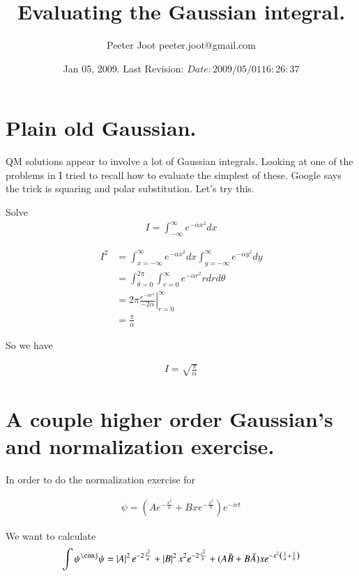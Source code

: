 \documentclass{article}
\title{ Evaluating the Gaussian integral. }
\author{Peeter Joot \quad peeter.joot@gmail.com}
\date{ Jan 05, 2009.  Last Revision: $Date: 2009/05/01 16:26:37 $ }
\begin{document}
\maketitle{}
\section{ Plain old Gaussian. }

QM solutions appear to involve a lot of Gaussian integrals.  Looking at one
of the problems in \cite{mcmahon2005qmd} I tried to recall how to evaluate
the simplest of these.  Google says the trick is squaring and polar 
substitution.  Let's try this.

Solve
\begin{align*}
I = \int_{-\infty}^\infty e^{-\alpha x^2} dx
\end{align*}

\begin{align*}
I^2 
&= \int_{x= -\infty}^\infty e^{-\alpha x^2} dx \int_{y = -\infty}^\infty e^{-\alpha y^2} dy \\
&= \int_{\theta=0}^{2\pi}\int_{r= 0}^\infty e^{-\alpha r^2} r dr d\theta \\
&= 2\pi 
{\left.
\frac{e^{-\alpha r^2}}{-2\alpha}
\right\vert}_{r= 0}^\infty  \\
&= \frac{\pi}{\alpha}
\end{align*}

So we have

\begin{align*}
I = \sqrt{\frac{\pi}{\alpha}}
\end{align*}

\section{ A couple higher order Gaussian's and normalization exercise. }

In order to do the normalization exercise for

\begin{align}\label{eqn:exersize}
\psi = \left(A e^{-\frac{x^2}{a}} +B x e^{-\frac{x^2}{b}}\right) e^{-ict}
\end{align}

We want to calculate
\begin{align*}
\int \psi^\conj \psi = 
\Abs{A}^2 e^{-2\frac{x^2}{a}} +\Abs{B}^2 x^2 e^{-2\frac{x^2}{b}}
+ (A\bar{B} + B\bar{A}) x e^{-x^2\left(\inv{a} + \inv{b}\right)}
\end{align*}
\end{document}
